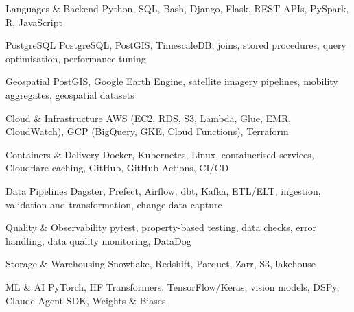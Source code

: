 
\begin{cvskills}

  \cvskill
    {Languages \& Backend}
    {Python, SQL, Bash, Django, Flask, REST APIs, PySpark, R, JavaScript}

  \cvskill
    {PostgreSQL}
    {PostgreSQL, PostGIS, TimescaleDB, joins, stored procedures, query optimisation, performance tuning}

  \cvskill
    {Geospatial}
    {PostGIS, Google Earth Engine, satellite imagery pipelines, mobility aggregates, geospatial datasets}

  \cvskill
    {Cloud \& Infrastructure}
    {AWS (EC2, RDS, S3, Lambda, Glue, EMR, CloudWatch), GCP (BigQuery, GKE, Cloud Functions), Terraform}

  \cvskill
    {Containers \& Delivery}
    {Docker, Kubernetes, Linux, containerised services, Cloudflare caching, GitHub, GitHub Actions, CI/CD}

  \cvskill
    {Data Pipelines}
    {Dagster, Prefect, Airflow, dbt, Kafka, ETL/ELT, ingestion, validation and transformation, change data capture}

  \cvskill
    {Quality \& Observability}
    {pytest, property-based testing, data checks, error handling, data quality monitoring, DataDog}

  \cvskill
    {Storage \& Warehousing}
    {Snowflake, Redshift, Parquet, Zarr, S3, lakehouse}

  \cvskill
    {ML \& AI}
    {PyTorch, HF Transformers, TensorFlow/Keras, vision models, DSPy, Claude Agent SDK, Weights \& Biases}

\end{cvskills}
